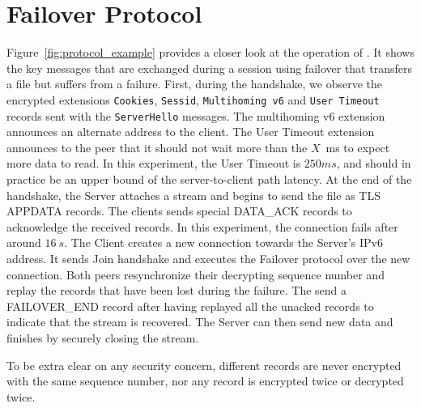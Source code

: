 \section{Failover Protocol}

Figure~\ref{fig:protocol_example} provides a closer look at the operation of \tcpls. It
shows the key \tcpls messages that are exchanged during a \tcpls session using failover
that transfers a file but suffers from a failure. First, during the \tcpls
handshake, we observe the \tls encrypted extensions \texttt{Cookies}, \texttt{Sessid},
\texttt{Multihoming v6} and \texttt{User Timeout} records sent with the
\texttt{ServerHello} messages. The multihoming v6 extension announces an
alternate address to the client. The User Timeout \tcpls extension
announces to the peer that it should not wait more than the $X$~ms to expect
more data to read. In this experiment, the User Timeout is $250ms$, and
should in practice be an upper bound of the server-to-client path latency.
At the end of the handshake, the Server attaches a stream and
begins to send the file as TLS APPDATA records. The clients sends
special \tcpls DATA\_ACK records to acknowledge the received records. In this
experiment, the \tcp connection fails after around $16~s$. The Client creates
a new \tcp connection towards the Server's IPv6 address. It sends Join \tcpls handshake
and executes the Failover protocol over the new connection. Both peers
resynchronize their decrypting sequence number and replay the records that have
been lost during the failure. The send a FAILOVER\_END record after having replayed all
the unacked records to indicate that the stream is recovered. The Server can then
send new data and finishes by securely closing the stream.

To be extra clear on any security concern, different records are never encrypted
with the same sequence number, nor any record is encrypted twice or decrypted
twice.

\def\Client{Client}
\def\Server{Server}
\def\Inactivity{Inactivity}
\def\Event{Event}



